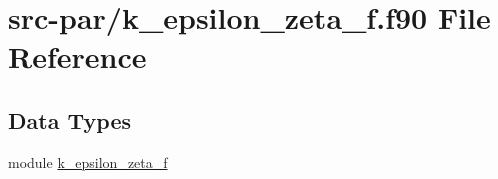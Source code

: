\hypertarget{k__epsilon__zeta__f_8f90}{\section{src-\/par/k\-\_\-epsilon\-\_\-zeta\-\_\-f.f90 File Reference}
\label{k__epsilon__zeta__f_8f90}
}
\subsection*{Data Types}
\begin{DoxyCompactItemize}
\item 
module \hyperlink{classk__epsilon__zeta__f}{k\-\_\-epsilon\-\_\-zeta\-\_\-f}
\end{DoxyCompactItemize}
